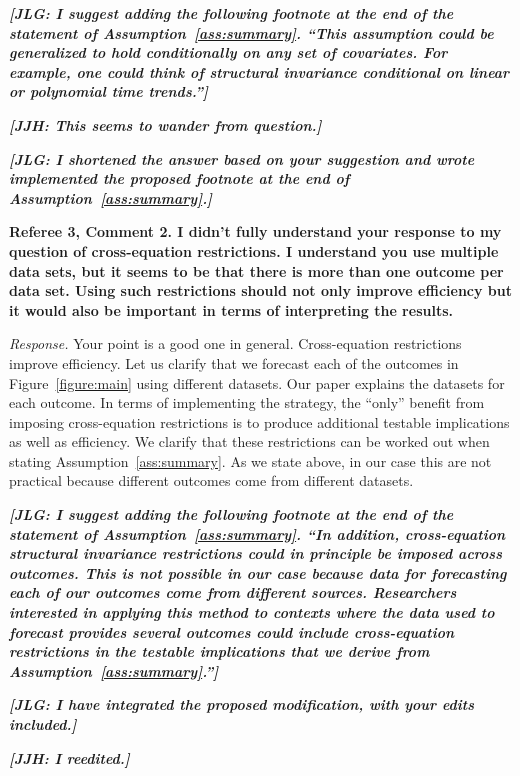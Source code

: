 \textit{\textbf{[JLG: I suggest adding the following footnote at the end of the statement of Assumption~\ref{ass:summary}. ``This assumption could be generalized to hold conditionally on any set of covariates. For example, one could think of structural invariance conditional on linear or polynomial time trends.'']}}

\textit{\textbf{[JJH: This seems to wander from question.]}}

\textit{\textbf{[JLG: I shortened the answer based on your suggestion and wrote implemented the proposed footnote at the end of  Assumption~\ref{ass:summary}.]}}

\noindent \textbf{Referee 3, Comment 2. I didn't fully understand your response to my question of cross-equation restrictions. I understand you use multiple data sets, but it seems to be that there is more than one outcome per data set. Using such restrictions should not only improve efficiency but it would also be important in terms of interpreting the results.} 

\noindent \textit{Response.} Your point is a good one in general. Cross-equation restrictions improve efficiency. Let us clarify that we forecast each of the outcomes in Figure~\ref{figure:main} using different datasets. Our paper explains the datasets for each outcome. In terms of implementing the strategy, the ``only'' benefit from imposing cross-equation restrictions is to produce additional testable implications as well as efficiency. We clarify that these restrictions can be worked out when stating Assumption~\ref{ass:summary}. As we state above, in our case this are not practical because different outcomes come from different datasets. 

\textit{\textbf{[JLG: I suggest adding the following footnote at the end of the statement of Assumption~\ref{ass:summary}. ``In addition, cross-equation structural invariance restrictions could in principle be imposed across outcomes. This is not possible in our case because data for forecasting each of our outcomes come from different sources. Researchers interested in applying this method to contexts where the data used to forecast provides several outcomes could include cross-equation restrictions in the testable implications that we derive from Assumption~\ref{ass:summary}.'']}} 

\textit{\textbf{[JLG: I have integrated the proposed modification, with your edits included.]}}

\textit{\textbf{[JJH: I reedited.]}}

